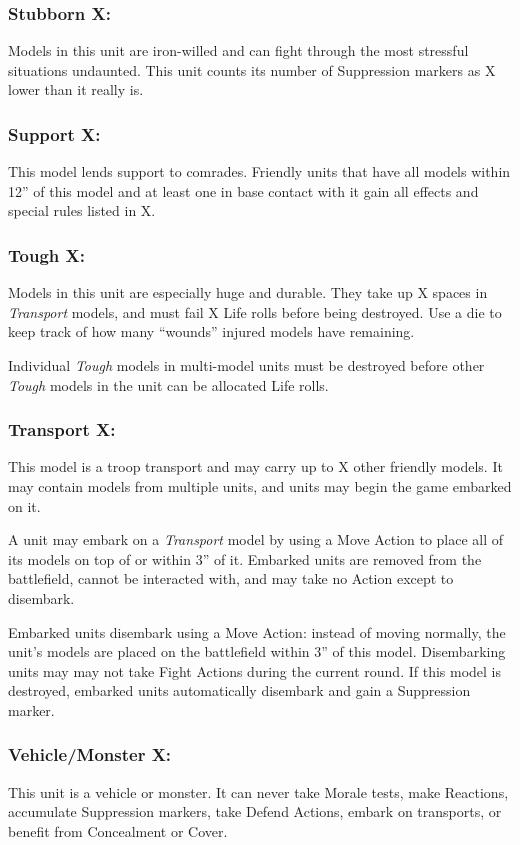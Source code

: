 \begin{multicols}{2}
\subsubsection*{Stubborn X:} Models in this unit are iron-willed and can fight through the most stressful situations undaunted. This unit counts its number of Suppression markers as X lower than it really is.

\subsubsection*{Support X:} This model lends support to comrades. Friendly units that have all models within 12'' of this model and at least one in base contact with it gain all effects and special rules listed in X.

\subsubsection*{Tough X:} Models in this unit are especially huge and durable. They take up X spaces in \textit{Transport} models, and must fail X Life rolls before being destroyed. Use a die to keep track of how many ``wounds'' injured models have remaining.

Individual \textit{Tough} models in multi-model units must be destroyed before other \textit{Tough} models in the unit can be allocated Life rolls.

\subsubsection*{Transport X:} This model is a troop transport and may carry up to X other friendly models. It may contain models from multiple units, and units may begin the game embarked on it.

A unit may embark on a \textit{Transport} model by using a Move Action to place all of its models on top of or within 3'' of it. Embarked units are removed from the battlefield, cannot be interacted with, and may take no Action except to disembark.

Embarked units disembark using a Move Action: instead of moving normally, the unit's models are placed on the battlefield within 3'' of this model. Disembarking units may may not take Fight Actions during the current round. If this model is destroyed, embarked units automatically disembark and gain a Suppression marker.

\subsubsection*{Vehicle/Monster X:} This unit is a vehicle or monster. It can never take Morale tests, make Reactions, accumulate Suppression markers, take Defend Actions, embark on transports, or benefit from Concealment or Cover.


\end{multicols}
